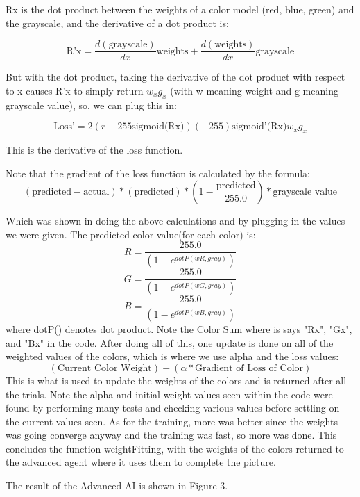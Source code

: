 \documentclass[11pt]{article}
\begin{document}
Rx is the dot product between the weights of a color model (red, blue, green) and the grayscale, and the derivative of a dot product is:

\[
\text{R'x} = \frac{d(\text{grayscale})}{dx}\text{weights} + \frac{d(\text{weights})}{dx}\text{grayscale}
\]

But with the dot product, taking the derivative of the dot product with respect to x causes R'x to simply return $w_x g_x$ (with w meaning weight and g meaning grayscale value), so, we can plug this in:

\[
\text{Loss'} = 2(r - 255\text{sigmoid(Rx)}) (-255) \text{sigmoid'(Rx)}w_x g_x
\]

This is the derivative of the loss function.

Note that the gradient of the loss function is calculated by the formula:
\[
(\text{predicted} - \text{actual})*(\text{predicted})*(1 - \frac{\text{predicted}}{255.0}) * \text{grayscale value}
\]

Which was shown in doing the above calculations and by plugging in the values we were given. The predicted color value(for each color) is:
\[
R = \frac{255.0}{(1 - e^{dotP(wR, gray)})}
\]
\[
G = \frac{255.0}{(1 - e^{dotP(wG, gray)})}
\]
\[
B = \frac{255.0}{(1 - e^{dotP(wB, gray)})}
\]
where dotP() denotes dot product.
Note the Color Sum where is says "Rx", "Gx", and "Bx" in the code. After doing all of this, one update is done on all of the weighted values of the colors, which is where we use alpha and the loss values:
\[
(\text{Current Color Weight}) - (\alpha * \text{Gradient of Loss of Color})
\]
This is what is used to update the weights of the colors and is returned after all the trials. Note the alpha and initial weight values seen within the code were found by performing many tests and checking various values before settling on the current values seen. As for the training, more was better since the weights was going converge anyway and the training was fast, so more was done. This concludes the function weightFitting, with the weights of the colors returned to the advanced agent where it uses them to complete the picture.

The result of the Advanced AI is shown in Figure 3.
\end{document}
